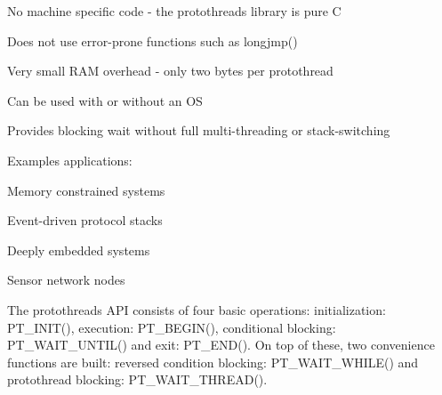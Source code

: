 \begin{DoxyItemize}
\item \-No machine specific code -\/ the protothreads library is pure \-C
\end{DoxyItemize}


\begin{DoxyItemize}
\item \-Does not use error-\/prone functions such as longjmp()
\end{DoxyItemize}


\begin{DoxyItemize}
\item \-Very small \-R\-A\-M overhead -\/ only two bytes per protothread
\end{DoxyItemize}


\begin{DoxyItemize}
\item \-Can be used with or without an \-O\-S
\end{DoxyItemize}


\begin{DoxyItemize}
\item \-Provides blocking wait without full multi-\/threading or stack-\/switching
\end{DoxyItemize}

\-Examples applications\-:


\begin{DoxyItemize}
\item \-Memory constrained systems
\end{DoxyItemize}


\begin{DoxyItemize}
\item \-Event-\/driven protocol stacks
\end{DoxyItemize}


\begin{DoxyItemize}
\item \-Deeply embedded systems
\end{DoxyItemize}


\begin{DoxyItemize}
\item \-Sensor network nodes
\end{DoxyItemize}

\-The protothreads \-A\-P\-I consists of four basic operations\-: initialization\-: \-P\-T\-\_\-\-I\-N\-I\-T(), execution\-: \-P\-T\-\_\-\-B\-E\-G\-I\-N(), conditional blocking\-: \-P\-T\-\_\-\-W\-A\-I\-T\-\_\-\-U\-N\-T\-I\-L() and exit\-: \-P\-T\-\_\-\-E\-N\-D(). \-On top of these, two convenience functions are built\-: reversed condition blocking\-: \-P\-T\-\_\-\-W\-A\-I\-T\-\_\-\-W\-H\-I\-L\-E() and protothread blocking\-: \-P\-T\-\_\-\-W\-A\-I\-T\-\_\-\-T\-H\-R\-E\-A\-D().

